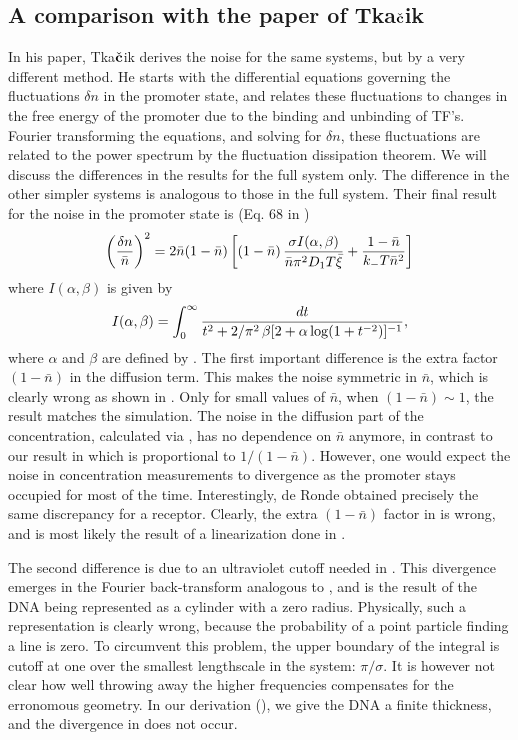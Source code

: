 \subsection{A comparison with the paper of Tka$\check{\bf c}$ik \cite{Tkacik2009}}
In his paper, Tka$\check{\bf c}$ik derives the noise for the same systems, but by a very different method. He starts with the differential equations governing the fluctuations $\delta n$ in the promoter state, and relates these fluctuations to changes in the free energy of the promoter due to the binding and unbinding of TF's. Fourier transforming the equations, and solving for $\delta n$, these fluctuations are related to the power spectrum by the fluctuation dissipation theorem. We will discuss the differences in the results for the full system only. The difference in the other simpler systems is analogous to those in the full system. Their final result for the noise in the promoter state is (Eq. 68 in \cite{Tkacik2009}) 
\begin{equation}
 \elabel{NoiseProTka}
 \left( \frac{\delta n}{\bar{n}} \right)^2 = 2 \bar{n}(1-\bar{n})\left[ (1 -\bar{n}) \, \frac{\sigma I(\alpha,\beta)}{\bar{n} \pi^2 D_1 T \bar{\xi}} + \frac{1-\bar{n}}{k_- T \bar{n}^2} \right]
\end{equation}
where $I(\alpha,\beta)$ is given by
\begin{equation}
 \elabel{IntProTka}
 I(\alpha,\beta) = \int_0^{\infty} \frac{dt}{t^2 + 2/\pi^{2} \, \beta[2 + \alpha \, {\rm log}(1 + t^{-2})]^{-1}},
\end{equation}
where $\alpha$ and $\beta$ are defined by . The first important difference is the extra factor $(1-\bar{n})$ in the diffusion term. This makes the noise symmetric in $\bar{n}$, which is clearly wrong as shown in . Only for small values of $\bar{n}$, when $(1-\bar{n})\sim 1$, the result matches the simulation. The noise in the diffusion part of the concentration, calculated via , has no dependence on $\bar{n}$ anymore, in contrast to our result in  which is proportional to $1/(1-\bar{n})$. However, one would expect the noise in concentration measurements to divergence as the promoter stays occupied for most of the time. Interestingly, de Ronde \cite{DeRonde2012} obtained precisely the same discrepancy for a receptor. Clearly, the extra $(1-\bar{n})$ factor in  is wrong, and is most likely the result of a linearization done in \cite{Tkacik2009}. 

The second difference is due to an ultraviolet cutoff needed in \cite{Tkacik2009}. This divergence emerges in the Fourier back-transform analogous to , and is the result of the DNA being represented as a cylinder with a zero radius. Physically, such a representation is clearly wrong, because the probability of a point particle finding a line is zero. To circumvent this problem, the upper boundary of the integral is cutoff at one over the smallest lengthscale in the system: $\pi/\sigma$. It is however not clear how well throwing away the higher frequencies compensates for the erronomous geometry. In our derivation (), we give the DNA a finite thickness, and the divergence in  does not occur. 

